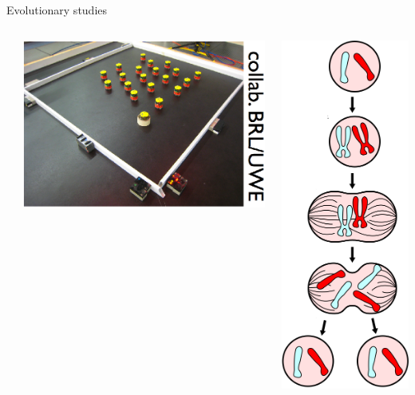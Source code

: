 \documentclass[8pt, handout=show,notes=show]{beamer}
\begin{document}
\begin{frame}{Evolutionary studies}
\begin{columns}
\begin{column}{.2\textwidth}
	    \end{column}
	    \begin{column}{.2\textwidth}
		    \includegraphics[width=.9\textwidth]{images/medea-RealRobots.png}
		    
	    \end{column}
	    \begin{column}{.2\textwidth}
		    \includegraphics[width=.4\textwidth]{images/mitosis.png}
		    
	    \end{column}
    \end{columns}
    
    
\end{frame}
\end{document}
